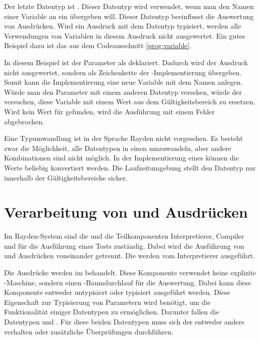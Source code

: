 \SuperPar
Der letzte Datentyp ist . Dieser Datentyp wird verwendet, wenn man den Namen einer Variable an ein  übergeben will. Dieser Datentyp beeinflusst die Auswertung von Ausdrücken. Wird ein Ausdruck mit dem Datentyp  typisiert, werden alle Verwendungen von Variablen in diesem Ausdruck nicht ausgewertet. Ein gutes Beispiel dazu ist das  aus dem Codeausschnitt \ref{prog:variable}.

\SuperPar
In diesem Beispiel ist der Parameter  als  deklariert. Dadurch wird der Ausdruck  nicht ausgewertet, sondern als Zeichenkette der -Implementierung übergeben. Somit kann die Implementierung eine neue Variable mit dem Namen  anlegen. Würde man den Parameter  mit einem anderen Datentyp versehen, würde der  versuchen, diese Variable mit einem Wert aus dem Gültigkeitsbereich zu ersetzen. Wird kein Wert für  gefunden, wird die Ausführung mit einem Fehler abgebrochen.

\SuperPar
Eine Typumwandlung ist in der Sprache Rayden nicht vorgesehen. Es besteht zwar die Möglichkeit, alle Datentypen in einen  umzuwandeln, aber andere Kombinationen sind nicht möglich. In der Implementierung eines  können die Werte beliebig konvertiert werden. Die Laufzeitumgebung stellt den Datentyp nur innerhalb der Gültigkeitsbereiche sicher.

\section{Verarbeitung von  und Ausdrücken}

Im Rayden-System sind die  und die Teilkomponenten Interpretierer, Compiler und  für die Ausführung eines Tests zuständig. Dabei wird die Ausführung von  und Ausdrücken voneinander getrennt. Die  werden vom Interpretierer ausgeführt. 

\SuperPar
Die Ausdrücke werden im  behandelt. Diese Komponente verwendet keine explizite -Maschine, sondern einen -Baumdurchlauf für die Auswertung. Dabei kann diese Komponente entweder untypisiert oder typisiert ausgeführt werden. Diese Eigenschaft zur Typisierung von Parametern wird benötigt, um die Funktionalität einiger Datentypen zu ermöglichen. Darunter fallen die Datentypen  und . Für diese beiden Datentypen muss sich der  entweder anders verhalten oder zusätzliche Überprüfungen durchführen. 

